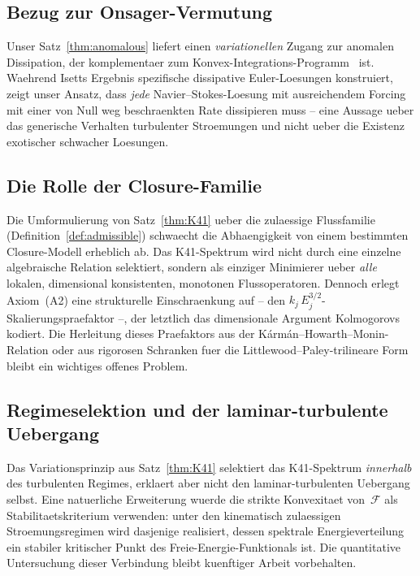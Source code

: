 \documentclass[12pt,a4paper]{article}
\theoremstyle{definition}
\theoremstyle{plain}
\theoremstyle{remark}
\begin{document}
\subsection{Bezug zur Onsager-Vermutung}

Unser Satz~\ref{thm:anomalous} liefert einen \emph{variationellen} Zugang
zur anomalen Dissipation, der komplementaer zum
Konvex-Integrations-Programm~\cite{Isett18} ist. Waehrend Isetts Ergebnis
spezifische dissipative Euler-Loesungen konstruiert, zeigt unser Ansatz,
dass \emph{jede} Navier--Stokes-Loesung mit ausreichendem Forcing mit
einer von Null weg beschraenkten Rate dissipieren muss -- eine Aussage
ueber das generische Verhalten turbulenter Stroemungen und nicht ueber die
Existenz exotischer schwacher Loesungen.

\subsection{Die Rolle der Closure-Familie}

Die Umformulierung von Satz~\ref{thm:K41} ueber die zulaessige
Flussfamilie (Definition~\ref{def:admissible}) schwaecht die Abhaengigkeit
von einem bestimmten Closure-Modell erheblich ab. Das K41-Spektrum wird
nicht durch eine einzelne algebraische Relation selektiert, sondern als
einziger Minimierer ueber \emph{alle} lokalen, dimensional konsistenten,
monotonen Flussoperatoren. Dennoch erlegt Axiom~(A2) eine strukturelle
Einschraenkung auf -- den $k_j\,E_j^{3/2}$-Skalierungspraefaktor --, der
letztlich das dimensionale Argument Kolmogorovs kodiert. Die Herleitung
dieses Praefaktors aus der K\'arm\'an--Howarth--Monin-Relation oder aus
rigorosen Schranken fuer die Littlewood--Paley-trilineare Form bleibt ein
wichtiges offenes Problem.

\subsection{Regimeselektion und der laminar-turbulente Uebergang}

Das Variationsprinzip aus Satz~\ref{thm:K41} selektiert das K41-Spektrum
\emph{innerhalb} des turbulenten Regimes, erklaert aber nicht den
laminar-turbulenten Uebergang selbst. Eine natuerliche Erweiterung wuerde
die strikte Konvexitaet von~$\mathcal{F}$ als Stabilitaetskriterium
verwenden: unter den kinematisch zulaessigen Stroemungsregimen wird
dasjenige realisiert, dessen spektrale Energieverteilung ein stabiler
kritischer Punkt des Freie-Energie-Funktionals ist. Die quantitative
Untersuchung dieser Verbindung bleibt kuenftiger Arbeit vorbehalten.
\end{document}
